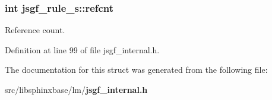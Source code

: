 \subsubsection[{refcnt}]{\setlength{\rightskip}{0pt plus 5cm}int jsgf\-\_\-rule\-\_\-s\-::refcnt}\label{structjsgf__rule__s_aeb4c05f6daa425a37d362e2c6de1228e}


Reference count. 



Definition at line 99 of file jsgf\-\_\-internal.\-h.



The documentation for this struct was generated from the following file\-:\begin{DoxyCompactItemize}
\item 
src/libsphinxbase/lm/{\bf jsgf\-\_\-internal.\-h}\end{DoxyCompactItemize}
